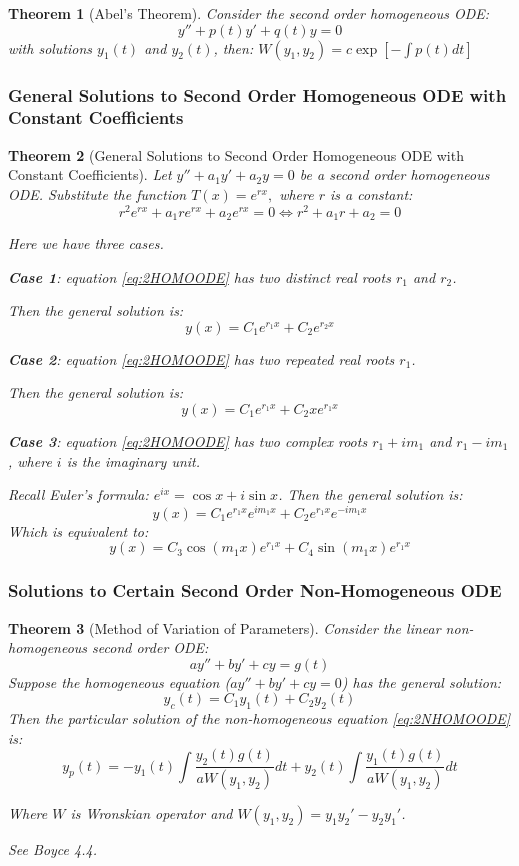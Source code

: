 \documentclass[12pt,a4paper]{article}
\newtheorem{theorem}{Theorem}[subsection]
\theoremstyle{definition}
\theoremstyle{remark}
\begin{document}
\begin{theorem}[Abel's Theorem]
	Consider the second order homogeneous ODE:
\[
	y'' + p(t)y' + q(t)y = 0
\] with solutions $y_1(t)$ and $y_2(t)$, then:
$W(y_1, y_2) = c \exp{\left[ - \int p(t) dt \right]}$
	
\end{theorem}
\subsubsection{General Solutions to Second Order Homogeneous ODE with Constant Coefficients}

\begin{theorem}[General Solutions to Second Order Homogeneous ODE with Constant Coefficients] \label{SolutionSOODEConstant}
	Let $y'' + a_1y' +  a_2y = 0$ be a second order homogeneous ODE.
	Substitute the function $T(x) = e^{rx},$ where $r$ is a constant:
\begin{equation}\label{eq:2HOMOODE}
		r^2e^{rx} + a_1re^{rx} + a_2e^{rx} = 0 \iff r^2 + a_1r + a_2 = 0
\end{equation}

Here we have three cases.

\textbf{Case 1}: equation \ref{eq:2HOMOODE} has two distinct real roots $r_1$ and $r_2$.

Then the general solution is: 
\[
	y(x) = C_1e^{r_1x} + C_2e^{r_2x}
\]

\textbf{Case 2}: equation \ref{eq:2HOMOODE} has two repeated real roots $r_1$.

Then the general solution is:
\[
	y(x) = C_1e^{r_1x} + C_2x e^{r_1x}
\]

\textbf{Case 3}: equation \ref{eq:2HOMOODE} has two complex roots $r_1+im_1$ and $r_1 - im_1$, where $i$ is the imaginary unit.

Recall Euler's formula: $e^{ix} = \cos x + i \sin x$.
Then the general solution is:
\[
	y(x) = C_1e^{r_1x}e^{im_1x} + C_2e^{r_1x}e^{-im_1x}
\]
Which is equivalent to:
\[
	y(x) = C_3\cos(m_1x)e^{r_1x} + C_4\sin(m_1x)e^{r_1x}
\]
\end{theorem}

\subsubsection{Solutions to Certain Second Order Non-Homogeneous ODE}

\begin{theorem}[Method of Variation of Parameters]
	Consider the linear non-homogeneous second order ODE:
\begin{equation}\label{eq:2NHOMOODE}
	ay'' + by' + cy = g(t)
\end{equation}
Suppose the homogeneous equation ($ay'' + by' + cy = 0$) has the general solution:
\[
	y_c(t) = C_1y_1(t) + C_2y_2(t)
\]
Then the particular solution of the non-homogeneous equation \ref{eq:2NHOMOODE} is: 
\[
	y_p(t) = -y_1(t)\int \frac{y_2(t)g(t)}{aW(y_1,y_2)} dt + y_2(t)\int \frac{y_1(t)g(t)}{aW(y_1,y_2)} dt
\]

Where $W$ is Wronskian operator and 
$W(y_1,y_2) = y_1y_2' - y_2y_1'$.

See Boyce 4.4.
\end{theorem}
\end{document}
